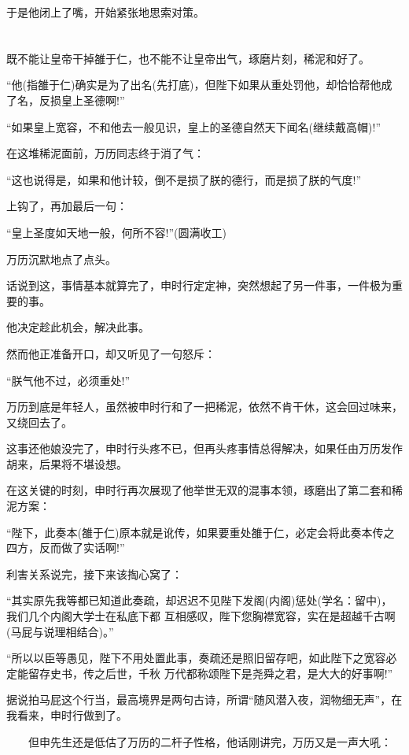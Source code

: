 \documentclass[11pt,a4paper,onecolumn]{article}
\begin{document}
于是他闭上了嘴，开始紧张地思索对策。

\section[\thesection]{}

既不能让皇帝干掉雒于仁，也不能不让皇帝出气，琢磨片刻，稀泥和好了。

``他(指雒于仁)确实是为了出名(先打底)，但陛下如果从重处罚他，却恰恰帮他成了名，反损皇上圣德啊!''

``如果皇上宽容，不和他去一般见识，皇上的圣德自然天下闻名(继续戴高帽)!''

在这堆稀泥面前，万历同志终于消了气：

``这也说得是，如果和他计较，倒不是损了朕的德行，而是损了朕的气度!''

上钩了，再加最后一句：

``皇上圣度如天地一般，何所不容!''(圆满收工)

万历沉默地点了点头。

话说到这，事情基本就算完了，申时行定定神，突然想起了另一件事，一件极为重要的事。

他决定趁此机会，解决此事。

然而他正准备开口，却又听见了一句怒斥：

``朕气他不过，必须重处!''

万历到底是年轻人，虽然被申时行和了一把稀泥，依然不肯干休，这会回过味来，又绕回去了。

这事还他娘没完了，申时行头疼不已，但再头疼事情总得解决，如果任由万历发作胡来，后果将不堪设想。

在这关键的时刻，申时行再次展现了他举世无双的混事本领，琢磨出了第二套和稀泥方案：

``陛下，此奏本(雒于仁)原本就是讹传，如果要重处雒于仁，必定会将此奏本传之四方，反而做了实话啊!''

利害关系说完，接下来该掏心窝了：

``其实原先我等都已知道此奏疏，却迟迟不见陛下发阁(内阁)惩处(学名：留中)，我们几个内阁大学士在私底下都
互相感叹，陛下您胸襟宽容，实在是超越千古啊(马屁与说理相结合)。''

``所以以臣等愚见，陛下不用处置此事，奏疏还是照旧留存吧，如此陛下之宽容必定能留存史书，传之后世，千秋
万代都称颂陛下是尧舜之君，是大大的好事啊!''

据说拍马屁这个行当，最高境界是两句古诗，所谓``随风潜入夜，润物细无声''，在我看来，申时行做到了。

　　但申先生还是低估了万历的二杆子性格，他话刚讲完，万历又是一声大吼：
\end{document}
